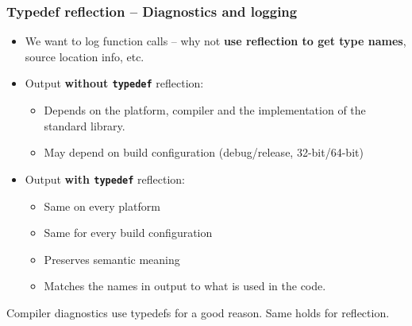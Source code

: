 \documentclass[compress,table,xcolor=table]{beamer}
\begin{document}
\begin{frame}[fragile]
\frametitle{Typedef reflection -- Diagnostics and logging}
  \begin{itemize}
  \item We want to log function calls -- why not \textbf{use reflection to get
    type names}, source location info, etc.
  \item Output \textbf{without \texttt{typedef}} reflection:
    \begin{itemize}
      \footnotesize
      \item Depends on the platform, compiler and the implementation of
        the standard library.
      \item May depend on build configuration (debug/release, 32-bit/64-bit)
    \end{itemize}
  \item Output \textbf{with \texttt{typedef}} reflection:
    \begin{itemize}
      \small
      \item Same on every platform
      \item Same for every build configuration
      \item Preserves semantic meaning
      \item Matches the names in output to what is used in the code.
    \end{itemize}
  \end{itemize}
  \Large Compiler diagnostics use typedefs for a good reason. Same holds for reflection.
\end{frame}
\end{document}
